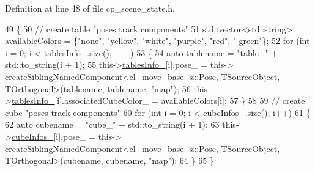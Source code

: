 Definition at line 48 of file cp\+\_\+scene\+\_\+state.\+h.


\begin{DoxyCode}
49             \{
50                 \textcolor{comment}{// create table "poses track components"}
51                 std::vector<std::string> availableColors = \{\textcolor{stringliteral}{"none"}, \textcolor{stringliteral}{"yellow"}, \textcolor{stringliteral}{"white"}, \textcolor{stringliteral}{"purple"}, \textcolor{stringliteral}{"red"}, \textcolor{stringliteral}{"
      green"}\};
52                 \textcolor{keywordflow}{for} (\textcolor{keywordtype}{int} i = 0; i < \hyperlink{classsm__fetch__two__table__whiskey__pour_1_1cl__perception__system_1_1CpSceneState_a5d6fd3eb480fbb9a241c44ddd42c2930}{tablesInfo\_}.size(); i++)
53                 \{
54                     \textcolor{keyword}{auto} tablename = \textcolor{stringliteral}{"table\_"} + std::to\_string(i + 1);
55                     this->\hyperlink{classsm__fetch__two__table__whiskey__pour_1_1cl__perception__system_1_1CpSceneState_a5d6fd3eb480fbb9a241c44ddd42c2930}{tablesInfo\_}[i].pose\_ = this->
      createSiblingNamedComponent<cl\_move\_base\_z::Pose, TSourceObject, TOrthogonal>(tablename, tablename, \textcolor{stringliteral}{"map"});
56                     this->\hyperlink{classsm__fetch__two__table__whiskey__pour_1_1cl__perception__system_1_1CpSceneState_a5d6fd3eb480fbb9a241c44ddd42c2930}{tablesInfo\_}[i].associatedCubeColor\_ = availableColors[i];
57                 \}
58 
59                 \textcolor{comment}{// create cube "poses track components"}
60                 \textcolor{keywordflow}{for} (\textcolor{keywordtype}{int} i = 0; i < \hyperlink{classsm__fetch__two__table__whiskey__pour_1_1cl__perception__system_1_1CpSceneState_a8106a20f8f9a385835a39f6fb2960165}{cubeInfos\_}.size(); i++)
61                 \{
62                     \textcolor{keyword}{auto} cubename = \textcolor{stringliteral}{"cube\_"} + std::to\_string(i + 1);
63                     this->\hyperlink{classsm__fetch__two__table__whiskey__pour_1_1cl__perception__system_1_1CpSceneState_a8106a20f8f9a385835a39f6fb2960165}{cubeInfos\_}[i].pose\_ = this->
      createSiblingNamedComponent<cl\_move\_base\_z::Pose, TSourceObject, TOrthogonal>(cubename, cubename, \textcolor{stringliteral}{"map"});
64                 \}
65             \}
\end{DoxyCode}


